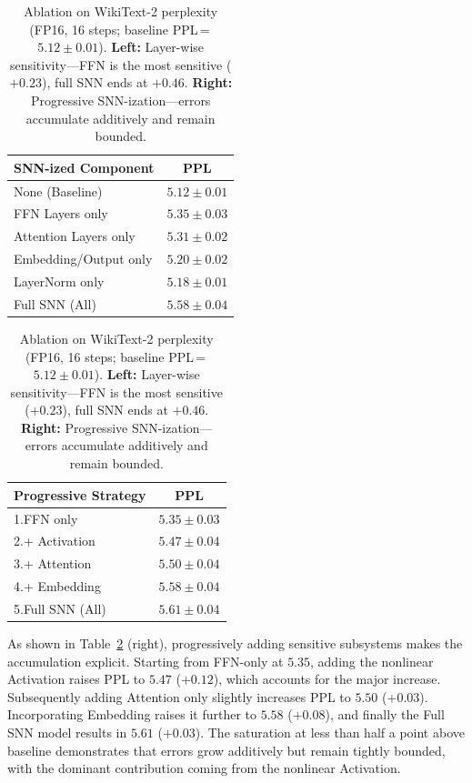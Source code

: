 \documentclass{article}
\theoremstyle{plain}
\theoremstyle{definition}
\theoremstyle{remark}
\begin{document}
\begin{table}[h!]
\centering
\caption{Ablation on WikiText-2 perplexity (FP16, 16 steps; baseline PPL\,=\,$5.12\pm0.01$). \textbf{Left:} Layer-wise sensitivity---FFN is the most sensitive ($+0.23$), full SNN ends at $+0.46$. \textbf{Right:} Progressive SNN-ization---errors accumulate additively and remain bounded.}
\label{tab:layerwise_ablation}
\label{tab:progressive_ablation}
\vspace{0.5em}
\begin{minipage}[t]{0.48\textwidth}
\centering
\small
\begin{tabular}{lc}
\hline
\textbf{SNN-ized Component} & \textbf{PPL} \\
\hline
None (Baseline)           & $5.12\pm 0.01$ \\
FFN Layers only           & $5.35 \pm 0.03$ \\
Attention Layers only     & $5.31 \pm 0.02$ \\
Embedding/Output only     & $5.20 \pm 0.02$ \\
LayerNorm only            & $5.18 \pm 0.01$ \\
Full SNN (All)            & $5.58 \pm 0.04$ \\
\hline
\end{tabular}
\end{minipage}
\hfill
\begin{minipage}[t]{0.48\textwidth}
\centering
\small
\begin{tabular}{lc}
\hline
\textbf{Progressive Strategy} & \textbf{PPL} \\
\hline
1.\;FFN only                        & $5.35 \pm 0.03$ \\
2.\;+ Activation                    & $5.47 \pm 0.04$ \\
3.\;+ Attention                     & $5.50 \pm 0.04$ \\
4.\;+ Embedding                     & $5.58 \pm 0.04$ \\
5.\;Full SNN (All)                  & $5.61 \pm 0.04$ \\
\hline
\end{tabular}
\end{minipage}
\end{table}

As shown in Table~\ref{tab:progressive_ablation} (right), progressively adding sensitive subsystems makes the accumulation explicit. Starting from FFN-only at $5.35$, adding the nonlinear Activation raises PPL to $5.47$ ($+0.12$), which accounts for the major increase. Subsequently adding Attention only slightly increases PPL to $5.50$ ($+0.03$). Incorporating Embedding raises it further to $5.58$ ($+0.08$), and finally the Full SNN model results in $5.61$ ($+0.03$). The saturation at less than half a point above baseline demonstrates that errors grow additively but remain tightly bounded, with the dominant contribution coming from the nonlinear Activation.
\end{document}
